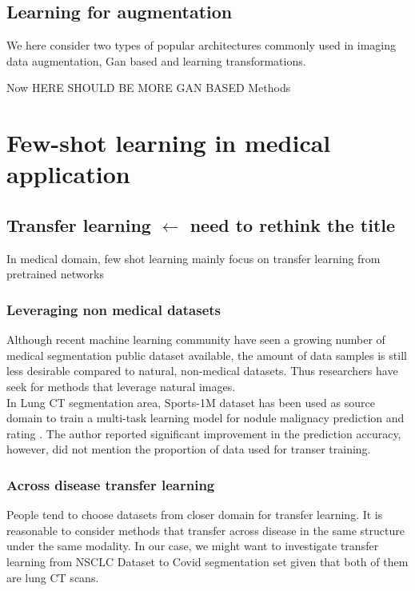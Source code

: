 \subsection{Learning for augmentation}
We here consider two types of popular architectures commonly used in imaging data augmentation, Gan based and learning transformations.


Now HERE SHOULD BE MORE GAN BASED Methods

%

\section{Few-shot learning in medical application}
\subsection{Transfer learning $\leftarrow$ need to rethink the title}
In medical domain, few shot learning mainly focus on transfer learning from pretrained networks
\subsubsection{Leveraging non medical datasets}
Although recent machine learning community have seen a growing number of medical segmentation public dataset available, the amount of data samples is still less desirable compared to natural, non-medical datasets. Thus researchers have seek for methods that leverage natural images.\\

In Lung CT segmentation area, Sports-1M dataset has been used as source domain to train a multi-task learning model for nodule malignacy prediction and rating \cite{hussein_risk_2017}. The author reported significant improvement in the prediction accuracy, however, did not mention the proportion of data used for transer training.



\subsubsection{Across disease transfer learning}
People tend to choose datasets from closer domain for transfer learning. It is reasonable to consider methods that transfer across disease in the same structure under the same modality. In our case, we might want to investigate transfer learning from NSCLC Dataset to Covid segmentation set given that both of them are lung CT scans.\\

